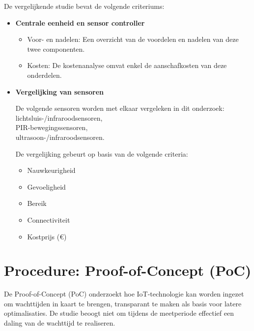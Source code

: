 De vergelijkende studie bevat de volgende criteriums:
\begin{itemize}
    \item \textbf{Centrale eenheid en sensor controller}
    \begin{itemize}
        \item Voor- en nadelen: Een overzicht van de voordelen en nadelen van deze twee componenten.
        \item Kosten: De kostenanalyse omvat enkel de aanschafkosten van deze onderdelen.  
    \end{itemize}
    
\item \textbf{Vergelijking van sensoren}

De volgende sensoren worden met elkaar vergeleken in dit onderzoek: \\
lichtsluis-/infraroodsensoren, \\ PIR-bewegingssensoren, \\ ultrasoon-/infraroodsensoren.

De vergelijking gebeurt op basis van de volgende criteria:

\begin{itemize}
    \item Nauwkeurigheid
    \item Gevoeligheid
    \item Bereik
    \item Connectiviteit
    \item Kostprijs (€)
\end{itemize}
    
    
\end{itemize}


\section{Procedure: Proof-of-Concept (PoC)}
De Proof-of-Concept (PoC) onderzoekt hoe IoT-technologie kan worden ingezet om wachttijden in kaart te brengen, transparant te maken als basis voor latere optimalisaties. De studie beoogt niet om tijdens de meetperiode effectief een daling van de wachttijd te realiseren.

